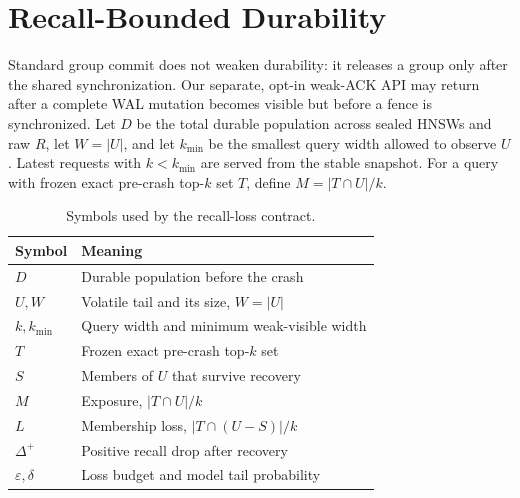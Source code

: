 \documentclass[sigconf,nonacm,balance=false]{acmart}
\begin{document}
\section{Recall-Bounded Durability}
\label{sec:recall}
Standard group commit does not weaken durability: it releases a group only after
the shared synchronization. Our separate, opt-in weak-ACK API may return after a
complete WAL mutation becomes visible but before a fence is synchronized. Let
$D$ be the total durable population across sealed HNSWs and raw $R$, let
$W=|U|$, and let $k_{\min}$ be the smallest query width allowed to observe $U$.
Latest requests with $k<k_{\min}$ are served from the stable snapshot. For a query
with frozen exact pre-crash top-$k$ set $T$, define
$M=|T\cap U|/k$.

\begin{table}[t]
\centering
\small
\caption{Symbols used by the recall-loss contract.}
\label{tab:symbols}
\begin{tabular}{@{}ll@{}}
\toprule
Symbol & Meaning \\
\midrule
$D$ & Durable population before the crash \\
$U,W$ & Volatile tail and its size, $W=|U|$ \\
$k,k_{\min}$ & Query width and minimum weak-visible width \\
$T$ & Frozen exact pre-crash top-$k$ set \\
$S$ & Members of $U$ that survive recovery \\
$M$ & Exposure, $|T\cap U|/k$ \\
$L$ & Membership loss, $|T\cap(U-S)|/k$ \\
$\Delta^+$ & Positive recall drop after recovery \\
$\varepsilon,\delta$ & Loss budget and model tail probability \\
\bottomrule
\end{tabular}
\end{table}
\end{document}
